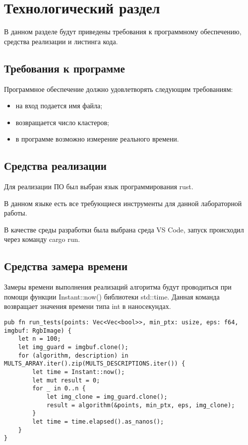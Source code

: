 \chapter{Технологический раздел}

В данном разделе будут приведены требования к программному обеспечению, средства реализации и листинга кода.

\section{Требования к программе}

Программное обеспечение должно удовлетворять следующим требованиям:
\begin{itemize}
	\item на вход подается имя файла;
	\item возвращается число кластеров;
	\item в программе возможно измерение реального времени.
\end{itemize}

\section{Средства реализации} 
Для реализации ПО был выбран язык программирования rust\cite{python}. 

В данном языке есть все требующиеся инструменты для данной лабораторной работы.

В качестве среды разработки была выбрана среда VS Code\cite{vscode}, запуск происходил через команду cargo run.

\section{Средства замера времени}

Замеры времени выполнения реализаций алгоритма будут проводиться при помощи функции Instant::now() \cite{test} библиотеки std::time. Данная команда возвращает значения  времени типа int в наносекундах.

\newpage

\begin{lstlisting}[label=bench,caption=Пример замера затраченного времени]
pub fn run_tests(points: Vec<Vec<bool>>, min_ptx: usize, eps: f64, imgbuf: RgbImage) {
	let n = 100;
	let img_guard = imgbuf.clone();
	for (algorithm, description) in MULTS_ARRAY.iter().zip(MULTS_DESCRIPTIONS.iter()) {
		let time = Instant::now();
		let mut result = 0;
		for _ in 0..n {
			let img_clone = img_guard.clone();
			result = algorithm(&points, min_ptx, eps, img_clone);
		}
		let time = time.elapsed().as_nanos();
	}
}
\end{lstlisting}



